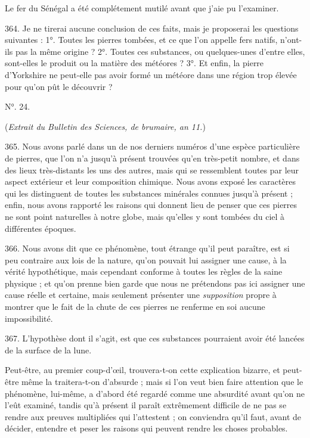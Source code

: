 \documentclass[a4paper, 11pt, oneside, polutonikogreek, french]{article}
\begin{document}
Le fer du Sénégal a été complétement mutilé avant que j'aie pu l'examiner.

364. Je ne tirerai aucune conclusion de ces faits, mais je proposerai les questions suivantes : 1°. Toutes les pierres tombées, et ce que l'on appelle fers natifs, n'ont-ils pas la même origine ? 2°. Toutes ces substances, ou quelques-unes d'entre elles, sont-elles le produit ou la matière des météores ? 3°. Et enfin, la pierre d'Yorkshire ne peut-elle pas avoir formé un météore dans une région trop élevée pour qu'on pût le découvrir ?

\begin{center}
N°. 24.
\end{center}

\begin{center}
(\emph{Extrait du Bulletin des Sciences, de brumaire, an 11.})
\end{center}

365. \og Nous avons parlé dans un de nos derniers numéros d'une espèce particulière de pierres, que l'on n'a jusqu'à présent trouvées qu'en très-petit nombre, et dans des lieux très-distants les uns des autres, mais qui se ressemblent toutes par leur aspect extérieur et leur composition chimique. Nous avons exposé les caractères qui les distinguent de toutes les substances minérales connues jusqu'à présent ; enfin, nous avons rapporté les raisons qui donnent lieu de penser que ces pierres ne sont point naturelles à notre globe, mais qu'elles y sont tombées du ciel à différentes époques. \fg

366. \og Nous avons dit que ce phénomène, tout étrange qu'il peut paraître, est si peu contraire aux lois de la nature, qu'on pouvait lui assigner une cause, à la vérité hypothétique, mais cependant conforme à toutes les règles de la saine physique ; et qu'on prenne bien garde que nous ne prétendons pas ici assigner une cause réelle et certaine, mais seulement présenter une \emph{supposition} propre à montrer que le fait de la chute de ces pierres ne renferme en soi aucune impossibilité. \fg

367. L'hypothèse dont il s'agit, est que ces substances pourraient avoir été lancées de la surface de la lune.

Peut-être, au premier coup-d'œil, trouvera-t-on cette explication bizarre, et peut-être même la traitera-t-on d'absurde ; mais si l'on veut bien faire attention que le phénomène, lui-même, a d'abord été regardé comme une absurdité avant qu'on ne l'eût examiné, tandis qu'à présent il paraît extrêmement difficile de ne pas se rendre aux preuves multipliées qui l'attestent ; on conviendra qu'il faut, avant de décider, entendre et peser les raisons qui peuvent rendre les choses probables.
\end{document}
